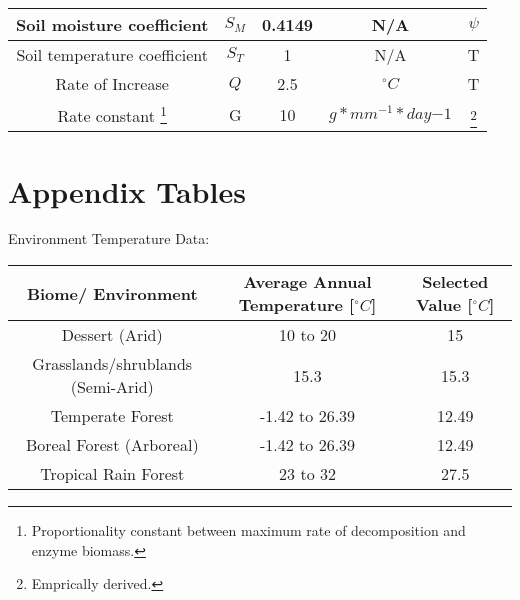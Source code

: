 \documentclass{article}
\begin{document}
\begin{savenotes}
\begin{table}[ht]
\begin{center}
\begin{tabular}{|c c c c c|}
 \hline
 Soil moisture coefficient & $S_M$ & 0.4149 & N/A &\cite{Moorhead1991} $\psi$\\ %
 \hline
 Soil temperature coefficient & $S_T$ & 1 & N/A &\cite{Moorhead1991} T\\
 \hline
 Rate of Increase & $Q$ & 2.5 & $^{\circ}C$ &\cite{Moorhead1991} T\\
 \hline
 Rate constant \footnote{Proportionality constant between maximum rate of decomposition and enzyme biomass.} & G & 10 & $g*mm^{-1}*day{-1}$ &\cite{Lustenhouwer2020}\footnote{Emprically derived.}\\  %
 \hline
\end{tabular}
\end{center}
\end{table}
\end{savenotes}


\section{Appendix Tables}

Environment Temperature Data:
\begin{table}[H]
\begin{center}
 \begin{tabular}{|c c c|} 
 \hline
 Biome/ Environment & Average Annual Temperature [$^{\circ}C$] & Selected Value [$^{\circ}C$]\\ [0.5ex] 
 \hline\hline
 Dessert (Arid) & 10 to 20 \cite{Davey2007} & 15 \\ 
 \hline
 Grasslands/shrublands (Semi-Arid) & 15.3 \cite{Pelaez1992} & 15.3 \\
 \hline
 Temperate Forest & -1.42 to 26.39 \cite{Zaz2018} & 12.49 \\
 \hline
 Boreal Forest (Arboreal)& -1.42 to 26.39 \cite{Zaz2018} & 12.49 \\
 \hline
 Tropical Rain Forest & 23 to 32 \cite{Paton2020} &27.5 \\
 \hline
\end{tabular}
\end{center}
\end{table}

 
\end{document}
